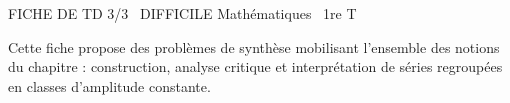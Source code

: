 \documentclass[11pt]{article}
\begin{document}
\begin{tcolorbox}[enhanced,colback=popink,colframe=popink,arc=10pt,boxrule=0pt,left=12pt,right=12pt,top=9pt,bottom=9pt]
{\color{white}\popxbold\small FICHE DE TD 3/3 \textbullet\ DIFFICILE \hfill Mathématiques \textbullet\ 1re T\par}
\end{tcolorbox}
\vspace{4pt}
Cette fiche propose des problèmes de synthèse mobilisant l'ensemble des notions du chapitre : construction, analyse critique et interprétation de séries regroupées en classes d'amplitude constante.
\end{document}
